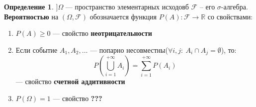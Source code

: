 \documentclass[english]{article}
\newcommand{\R}{\mathbb{R}}
\theoremstyle{plain}
\theoremstyle{remark}
\theoremstyle{definition}
\newtheorem*{definition}{Определение}
\begin{document}
\begin{definition}
\(] \Omega\) --- пространство элементарных исходовб \(\mathcal{F}\) -- его \(\sigma\)-алгебра.
\textbf{Вероятностью} на \((\Omega, \mathcal{F})\) обозначается функция \(P(A): \mathcal{F} \to \R\) со свойствами:
\begin{enumerate}
\item \(P(A) \ge 0\) --- свойство \textbf{неотрицательности}
\item Если событие \(A_1, A_2, \dots\) --- попарно несовместны(\(\forall i,j:\ A_i \cap A_j = \emptyset\)),
то: \[ P(\bigcup_{i = 1}^{+ \infty} A_i) = \sum_{i = 1}^{+ \infty} P(A_i) \] --- свойство \textbf{счетной аддитивности}
\item \(P(\Omega) = 1\) --- свойство \textbf{\color{red}???}
\end{enumerate}
\end{definition}
\end{document}
